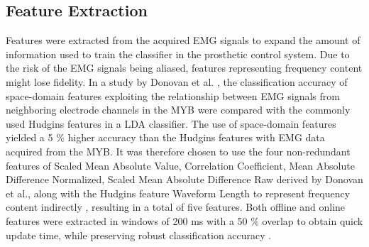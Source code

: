 \subsection{Feature Extraction}
Features were extracted from the acquired EMG signals to expand the amount of information used to train the classifier in the prosthetic control system. Due to the risk of the EMG signals being aliased, features representing frequency content might lose fidelity. In a study by Donovan et al. \cite{Donovan2017}, the classification accuracy of space-domain features exploiting the relationship between EMG signals from neighboring electrode channels in the MYB were compared with the commonly used Hudgins features in a LDA classifier. The use of space-domain features yielded a 5 $\%$ higher accuracy than the Hudgins features with EMG data acquired from the MYB. It was therefore chosen to use the four non-redundant features of Scaled Mean Absolute Value, Correlation Coefficient, Mean Absolute Difference Normalized, Scaled Mean Absolute Difference Raw derived by Donovan et al., along with the Hudgins feature Waveform Length to represent frequency content indirectly \cite{Hudgins1993}, resulting in a total of five features. Both offline and online features were extracted in windows of 200 ms with a 50 $\%$ overlap to obtain quick update time, while preserving robust classification accuracy \cite{Menon2017}. 

